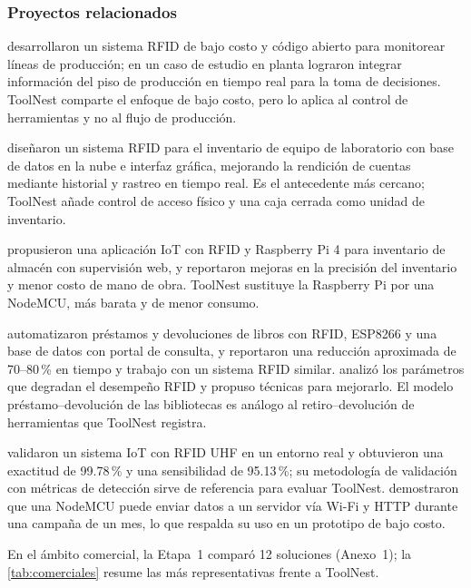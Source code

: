 \subsubsection{Proyectos relacionados}
\textcite{dejesuspacheco_rfid_2023} desarrollaron un sistema RFID de bajo costo y código abierto para monitorear líneas de producción; en un caso de estudio en planta lograron integrar información del piso de producción en tiempo real para la toma de decisiones. ToolNest comparte el enfoque de bajo costo, pero lo aplica al control de herramientas y no al flujo de producción.

\textcite{bandara_lowcost_2024} diseñaron un sistema RFID para el inventario de equipo de laboratorio con base de datos en la nube e interfaz gráfica, mejorando la rendición de cuentas mediante historial y rastreo en tiempo real. Es el antecedente más cercano; ToolNest añade control de acceso físico y una caja cerrada como unidad de inventario.

\textcite{bousselmi_inventory_2024} propusieron una aplicación IoT con RFID y Raspberry Pi 4 para inventario de almacén con supervisión web, y reportaron mejoras en la precisión del inventario y menor costo de mano de obra. ToolNest sustituye la Raspberry Pi por una NodeMCU, más barata y de menor consumo.

\textcite{gannamraju_library_2021} automatizaron préstamos y devoluciones de libros con RFID, ESP8266 y una base de datos con portal de consulta, y \textcite{basciftci_library_2021} reportaron una reducción aproximada de 70--80\,\% en tiempo y trabajo con un sistema RFID similar. \textcite{achary_library_2021} analizó los parámetros que degradan el desempeño RFID y propuso técnicas para mejorarlo. El modelo préstamo--devolución de las bibliotecas es análogo al retiro--devolución de herramientas que ToolNest registra.

\textcite{cernilova_goose_2023} validaron un sistema IoT con RFID UHF en un entorno real y obtuvieron una exactitud de 99.78\,\% y una sensibilidad de 95.13\,\%; su metodología de validación con métricas de detección sirve de referencia para evaluar ToolNest. \textcite{gueye_pollution_2024} demostraron que una NodeMCU puede enviar datos a un servidor vía Wi-Fi y HTTP durante una campaña de un mes, lo que respalda su uso en un prototipo de bajo costo.

En el ámbito comercial, la Etapa~1 comparó 12 soluciones (Anexo~1); la \autoref{tab:comerciales} resume las más representativas frente a ToolNest.


